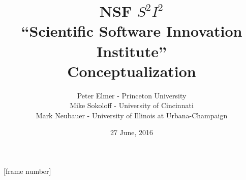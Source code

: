 \documentclass{beamer}
\title{NSF $ S^2 I^2 $\\ ``Scientific Software Innovation Institute'' \\ Conceptualization}
\author{Peter Elmer - Princeton University \\
        Mike Sokoloff - University of Cincinnati \\
        Mark Neubauer - University of Illinois at Urbana-Champaign}
\date{27 June, 2016}
\begin{document}
\maketitle

%
%

[frame number]












%




%









\end{document}

